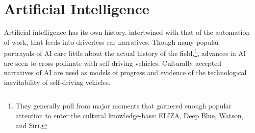 
\section{Artificial Intelligence}


Artificial intelligence has its own history, intertwined with that of the
automation of work, that feeds into driverless car narratives. Though many popular
portrayals of AI care little about the actual history of the
field,\footnote{They generally pull from major moments that garnered enough popular
attention to enter the cultural knowledge-base: ELIZA, Deep Blue,
Watson, and Siri.}, advances in AI are seen to cross-pollinate with
self-driving vehicles. Culturally accepted narratives of AI are used
as models of progress and evidence of the technological inevitability
of self-driving vehicles. 

